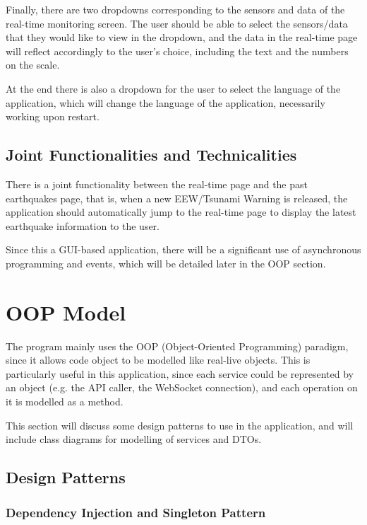 Finally, there are two dropdowns corresponding to the sensors and data of the real-time monitoring screen. The user should be able to select the sensors/data that they would like to view in the dropdown, and the data in the real-time page will reflect accordingly to the user's choice, including the text and the numbers on the scale.

At the end there is also a dropdown for the user to select the language of the application, which will change the language of the application, necessarily working upon restart.

\subsection{Joint Functionalities and Technicalities}

There is a joint functionality between the real-time page and the past earthquakes page, that is, when a new EEW/Tsunami Warning is released, the application should automatically jump to the real-time page to display the latest earthquake information to the user.

Since this a GUI-based application, there will be a significant use of asynchronous programming and events, which will be detailed later in the OOP section.

\section{OOP Model}

The program mainly uses the OOP (Object-Oriented Programming) paradigm, since it allows code object to be modelled like real-live objects. This is particularly useful in this application, since each service could be represented by an object (e.g. the API caller, the WebSocket connection), and each operation on it is modelled as a method.

This section will discuss some design patterns to use in the application, and will include class diagrams for modelling of services and DTOs.

\subsection{Design Patterns}

\subsubsection{Dependency Injection and Singleton Pattern}

